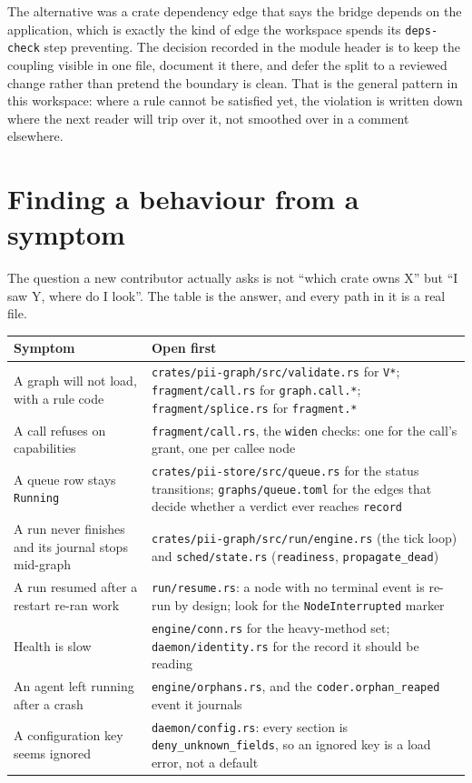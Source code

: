 The alternative was a crate dependency edge that says the bridge depends on the application, which
is exactly the kind of edge the workspace spends its \texttt{deps-check} step preventing. The
decision recorded in the module header is to keep the coupling visible in one file, document it
there, and defer the split to a reviewed change rather than pretend the boundary is clean. That is
the general pattern in this workspace: where a rule cannot be satisfied yet, the violation is
written down where the next reader will trip over it, not smoothed over in a comment elsewhere.

\section{Finding a behaviour from a symptom}

The question a new contributor actually asks is not \enquote{which crate owns X} but \enquote{I
saw Y, where do I look}. The table is the answer, and every path in it is a real file.

\begin{longtable}{@{}p{}p{}@{}}
	\toprule
	\textbf{Symptom} & \textbf{Open first} \\
	\midrule
	\endhead
	A graph will not load, with a rule code & \texttt{crates/pii-graph/src/validate.rs} for
	\texttt{V*}; \texttt{fragment/call.rs} for \texttt{graph.call.*}; \texttt{fragment/splice.rs} for
	\texttt{fragment.*} \\
	A call refuses on capabilities & \texttt{fragment/call.rs}, the \texttt{widen} checks: one for
	the call's grant, one per callee node \\
	A queue row stays \texttt{Running} & \texttt{crates/pii-store/src/queue.rs} for the status
	transitions; \texttt{graphs/queue.toml} for the edges that decide whether a verdict ever reaches
	\texttt{record} \\
	A run never finishes and its journal stops mid-graph & \texttt{crates/pii-graph/src/run/engine.rs}
	(the tick loop) and \texttt{sched/state.rs} (\texttt{readiness}, \texttt{propagate\_dead}) \\
	A run resumed after a restart re-ran work & \texttt{run/resume.rs}: a node with no terminal
	event is re-run by design; look for the \texttt{NodeInterrupted} marker \\
	Health is slow & \texttt{engine/conn.rs} for the heavy-method set;
	\texttt{daemon/identity.rs} for the record it should be reading \\
	An agent left running after a crash & \texttt{engine/orphans.rs}, and the
	\texttt{coder.orphan\_reaped} event it journals \\
	A configuration key seems ignored & \texttt{daemon/config.rs}: every section is
	\texttt{deny\_unknown\_fields}, so an ignored key is a load error, not a default \\
	\bottomrule
\end{longtable}

